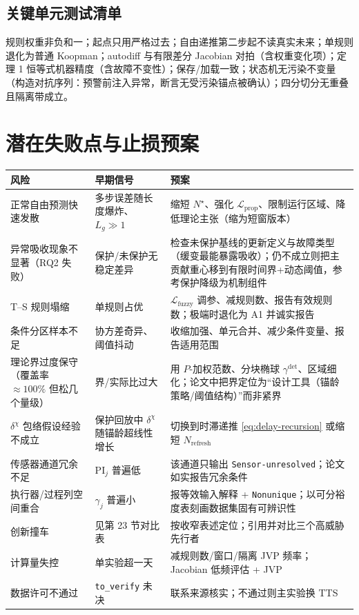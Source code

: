 \documentclass[11pt,a4paper]{ctexart}
\theoremstyle{remark}
\begin{document}
\subsection{关键单元测试清单}

规则权重非负和一；起点只用严格过去；自由递推第二步起不读真实未来；单规则退化为普通 Koopman；autodiff 与有限差分 Jacobian 对拍（含权重变化项）；定理 1 恒等式机器精度（含故障不变性）；保存/加载一致；状态机无污染不变量（构造对抗序列：预警前注入异常，断言无受污染锚点被确认）；四分切分无重叠且隔离带成立。

\section{潜在失败点与止损预案}

\begin{center}
\small
\begin{tabular}{p{}p{}p{}}
\toprule
风险 & 早期信号 & 预案 \\
\midrule
正常自由预测快速发散 & 多步误差随长度爆炸、$L_g\gg1$ & 缩短 $N^\star$、强化 $\mathcal L_{\mathrm{prop}}$、限制运行区域、降低理论主张（缩为短窗版本） \\
异常吸收现象不显著（RQ2 失败） & 保护/未保护无稳定差异 & 检查未保护基线的更新定义与故障类型（缓变最能暴露吸收）；仍不成立则把主贡献重心移到有限时间界+动态阈值，参考保护降级为机制组件 \\
T--S 规则塌缩 & 单规则占优 & $\mathcal L_{\mathrm{fuzzy}}$ 调参、减规则数、报告有效规则数；极端时退化为 A1 并诚实报告 \\
条件分区样本不足 & 协方差奇异、阈值抖动 & 收缩加强、单元合并、减少条件变量、报告适用范围 \\
理论界过度保守（覆盖率 $\approx100\%$ 但松几个量级） & 界/实际比过大 & 用 $P$-加权范数、分块椭球 $\gamma^{\mathrm{det}}$、区域细化；论文中把界定位为“设计工具（锚龄策略/阈值结构）”而非紧界 \\
$\delta^\chi$ 包络假设经验不成立 & 保护回放中 $\delta^\chi$ 随锚龄超线性增长 & 切换到时滞递推 \eqref{eq:delay-recursion} 或缩短 $N_{\mathrm{refresh}}$ \\
传感器通道冗余不足 & $\mathrm{PI}_j$ 普遍低 & 该通道只输出 \texttt{Sensor-unresolved}；论文如实报告冗余条件 \\
执行器/过程列空间重合 & $\gamma_j$ 普遍小 & 报等效输入解释 + \texttt{Nonunique}；以可分裕度表刻画数据集固有可辨识性 \\
创新撞车 & 见第 23 节对比表 & 按收窄表述定位；引用并对比三个高威胁先行者 \\
计算量失控 & 单实验超一天 & 减规则数/窗口/隔离 JVP 频率；Jacobian 低频评估 + JVP \\
数据许可不通过 & \texttt{to\_verify} 未决 & 联系来源核实；不通过则主实验换 TTS \\
\bottomrule
\end{tabular}
\end{center}
\end{document}

